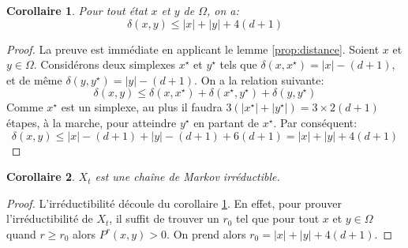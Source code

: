 \documentclass[11pt]{article}
\newtheorem{corollaire}{Corollaire}[subsection]
\begin{document}
\begin{corollaire}\label{cor:diametre}
  Pour tout état $x$ et $y$ de $\Omega$, on a:
  \begin{equation}
    \delta(x,y) \leq{|x| + |y| + 4(d+1)}
  \end{equation}
\end{corollaire}

\begin{proof}
    La preuve est immédiate en applicant le lemme \ref{prop:distance}. Soient $x$ et $y \in \Omega$. Considérons deux simplexes $x^\star$ et $y^\star$ tels que $\delta(x,x^\star) = |x| - (d+1)$, et de même $\delta(y,y^\star) = |y| - (d+1)$. On a la relation suivante:
\begin{equation}
    \delta(x,y) \leq{\delta(x,x^\star) + \delta(x^\star,y^\star) + \delta(y,y^\star)}
\end{equation}
Comme $x^\star$ est un simplexe, au plus il faudra $3(|x^\star| + |y^\star|) = 3 \times 2(d+1)$ étapes, à la marche, pour atteindre $y^\star$ en partant de $x^\star$. Par conséquent:
\begin{equation}
    \delta(x,y) \leq{|x| - (d+1) + |y| - (d+1) + 6(d+1)} = |x| + |y| + 4(d+1)
\end{equation}
\end{proof}

\begin{corollaire}
    $X_t$ est une chaîne de Markov irréductible.
\end{corollaire}

\begin{proof}
    L'irréductibilité découle du corollaire \ref{cor:diametre}. En effet, pour prouver l'irréductibilité de $X_t$, il suffit de trouver un $r_0$ tel que pour tout $x$ et $y \in \Omega$ quand $r \geq{r_0}$ alors $P^r(x,y)>0$. On prend alors $r_0 = |x| + |y| + 4(d+1)$.
\end{proof}
\end{document}
